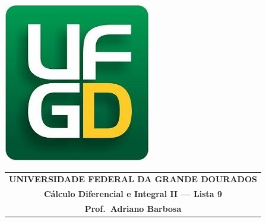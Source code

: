 \documentclass[a4paper,5pt]{amsbook}
\begin{document}
\thispagestyle{empty}
\pagestyle{empty}
\begin{minipage}[h]{0.14\textwidth}
	\includegraphics[scale=0.24]{../../ufgd.png}
\end{minipage}
\begin{minipage}[h]{\textwidth}
\begin{tabular}{c}
{{\bf UNIVERSIDADE FEDERAL DA GRANDE DOURADOS}}\\
{{\bf C\'{a}lculo Diferencial e Integral II --- Lista 9}}\\
{{\bf Prof.\ Adriano Barbosa}}\\
\end{tabular}
\vspace{-0.45cm}
%
\end{minipage}

\end{document}
